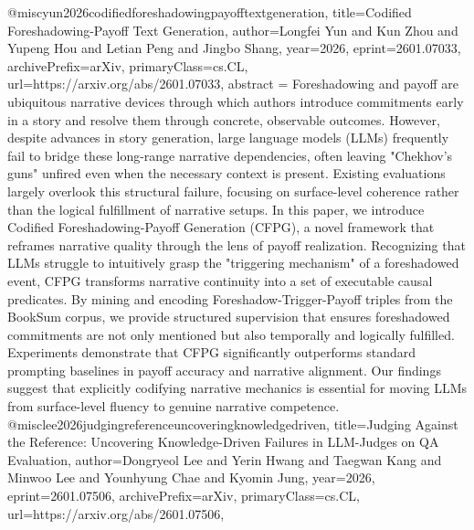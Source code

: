 {}@misc{yun2026codifiedforeshadowingpayofftextgeneration,
      title={Codified Foreshadowing-Payoff Text Generation}, 
      author={Longfei Yun and Kun Zhou and Yupeng Hou and Letian Peng and Jingbo Shang},
      year={2026},
      eprint={2601.07033},
      archivePrefix={arXiv},
      primaryClass={cs.CL},
      url={https://arxiv.org/abs/2601.07033},
      abstract = {Foreshadowing and payoff are ubiquitous narrative devices through which authors introduce commitments early in a story and resolve them through concrete, observable outcomes. However, despite advances in story generation, large language models (LLMs) frequently fail to bridge these long-range narrative dependencies, often leaving "Chekhov's guns" unfired even when the necessary context is present. Existing evaluations largely overlook this structural failure, focusing on surface-level coherence rather than the logical fulfillment of narrative setups. In this paper, we introduce Codified Foreshadowing-Payoff Generation (CFPG), a novel framework that reframes narrative quality through the lens of payoff realization. Recognizing that LLMs struggle to intuitively grasp the "triggering mechanism" of a foreshadowed event, CFPG transforms narrative continuity into a set of executable causal predicates. By mining and encoding Foreshadow-Trigger-Payoff triples from the BookSum corpus, we provide structured supervision that ensures foreshadowed commitments are not only mentioned but also temporally and logically fulfilled. Experiments demonstrate that CFPG significantly outperforms standard prompting baselines in payoff accuracy and narrative alignment. Our findings suggest that explicitly codifying narrative mechanics is essential for moving LLMs from surface-level fluency to genuine narrative competence.}
}@misc{lee2026judgingreferenceuncoveringknowledgedriven,
      title={Judging Against the Reference: Uncovering Knowledge-Driven Failures in LLM-Judges on QA Evaluation}, 
      author={Dongryeol Lee and Yerin Hwang and Taegwan Kang and Minwoo Lee and Younhyung Chae and Kyomin Jung},
      year={2026},
      eprint={2601.07506},
      archivePrefix={arXiv},
      primaryClass={cs.CL},
      url={https://arxiv.org/abs/2601.07506},
}

